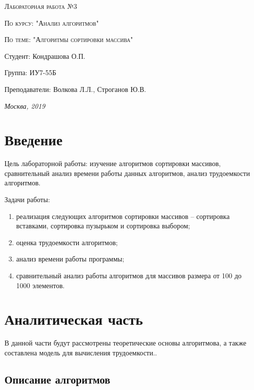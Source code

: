 \documentclass[a4paper, 14pt]{article}
\begin{document}
\begin{titlepage}
	\centering
	{\scshape\Large Лабораторная работа №3\par}
	{\scshape\Large По курсу: "Анализ алгоритмов"\par}
	{\scshape\Large По теме: "Алгоритмы сортировки массива"\par}
	\vspace{7cm}
	\Large Студент: Кондрашова О.П.\par
	\Large Группа: ИУ7-55Б\par
	\Large Преподаватели:  Волкова Л.Л., Строганов Ю.В.\par

	\vfill
	\large \textit {Москва, 2019} \par
	
\end{titlepage}

	\setcounter{page}{2}
	\tableofcontents
	
	\newpage
	\section*{Введение}
	
	
Цель лабораторной работы: изучение алгоритмов сортировки массивов, сравнительный анализ времени работы данных алгоритмов, анализ трудоемкости алгоритмов.
		 
	Задачи работы:
\begin{enumerate}
	\item реализация следующих алгоритмов сортировки массивов –  сортировка вставками, сортировка пузырьком и сортировка выбором;
	\item оценка трудоемкости алгоритмов;
	\item анализ времени работы программы;
	\item сравнительный анализ работы алгоритмов для массивов размера от 100 до 1000 элементов.
\end{enumerate}

	\newpage
	\section{Аналитическая часть}
	
	В данной части будут рассмотрены теоретические основы алгоритмова, а также составлена модель для вычисления трудоемкости..
	
	\subsection{Описание алгоритмов}
	
\end{document}

